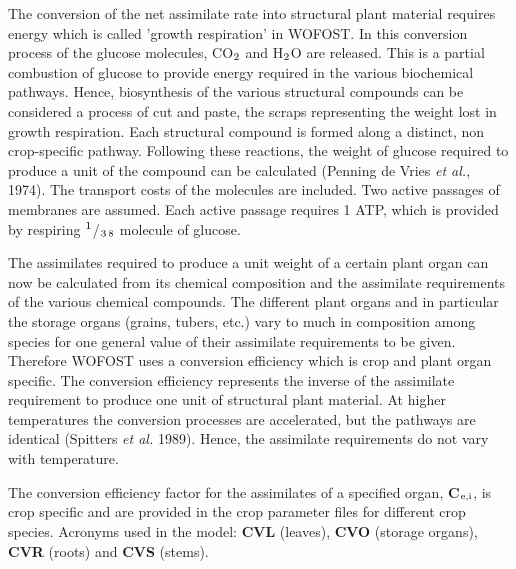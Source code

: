 The conversion of the net assimilate rate into structural plant material requires energy which is
called 'growth respiration' in WOFOST.
In this conversion process of the glucose molecules, CO$_{{\rm 2}}$ and
H$_{{\rm 2}}$O are released. This is a partial combustion of glucose to provide energy required in
the various biochemical pathways. Hence, biosynthesis of the various structural compounds can 
be considered a process of cut and paste, the scraps representing the weight
lost in growth respiration.
Each structural compound is formed along a distinct, non crop-specific pathway.
Following these reactions, the weight of glucose required to produce a unit of the
compound can be calculated (Penning de Vries {\it et al.}, 1974). The transport costs of the
molecules are included. Two active passages of membranes are assumed. Each active
passage requires 1 ATP, which is provided by respiring $^{{\rm 1}}$/$_{{\rm 3}}$$_{{\rm 8}}$ molecule of glucose.

The assimilates required to produce a unit weight of a certain plant organ can now be calculated from its chemical composition and the assimilate requirements of the various chemical compounds. The different plant organs and in particular the storage organs (grains, tubers, etc.) vary to much in composition among species for one general value of their assimilate requirements to be given. Therefore WOFOST uses a conversion efficiency which is crop and plant organ specific. 
The conversion efficiency represents the inverse of the assimilate requirement to produce one unit of structural plant material. At higher temperatures the conversion processes are accelerated, but the pathways are identical (Spitters {\it et al.} 1989). Hence, the assimilate requirements do not vary with temperature. 

The conversion efficiency factor for the assimilates of a specified organ, {\bf C$_{{\rm e,i}}$}, is crop
specific and are provided in the crop parameter files for different crop species. Acronyms used in the model: {\bf CVL} (leaves), {\bf CVO} (storage organs), {\bf CVR} (roots) and {\bf CVS} (stems).

%
%

